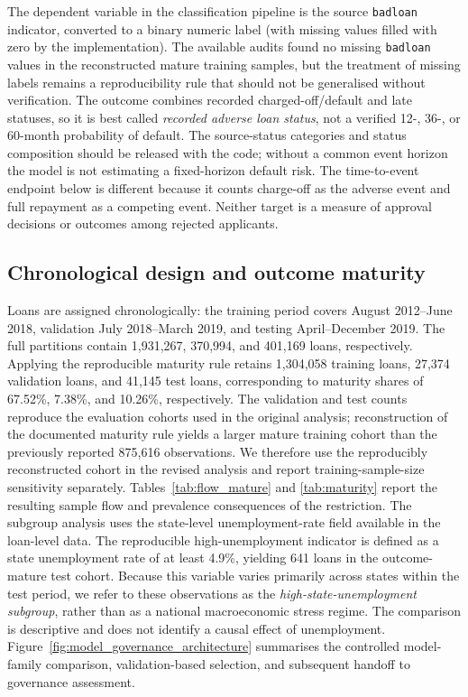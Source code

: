 \documentclass[10pt]{article}
\begin{document}
The dependent variable in the classification pipeline is the source \texttt{badloan} indicator, converted to a binary numeric label (with missing values filled with zero by the implementation). The available audits found no missing \texttt{badloan} values in the reconstructed mature training samples, but the treatment of missing labels remains a reproducibility rule that should not be generalised without verification. The outcome combines recorded charged-off/default and late statuses, so it is best called \emph{recorded adverse loan status}, not a verified 12-, 36-, or 60-month probability of default. The source-status categories and status composition should be released with the code; without a common event horizon the model is not estimating a fixed-horizon default risk. The time-to-event endpoint below is different because it counts charge-off as the adverse event and full repayment as a competing event. Neither target is a measure of approval decisions or outcomes among rejected applicants.

\subsection{Chronological design and outcome maturity}

Loans are assigned chronologically: the training period covers August 2012--June 2018, validation July 2018--March 2019, and testing April--December 2019. The full partitions contain 1,931,267, 370,994, and 401,169 loans, respectively. Applying the reproducible maturity rule retains 1,304,058 training loans, 27,374 validation loans, and 41,145 test loans, corresponding to maturity shares of 67.52\%, 7.38\%, and 10.26\%, respectively. The validation and test counts reproduce the evaluation cohorts used in the original analysis; reconstruction of the documented maturity rule yields a larger mature training cohort than the previously reported 875,616 observations. We therefore use the reproducibly reconstructed cohort in the revised analysis and report training-sample-size sensitivity separately. Tables~\ref{tab:flow_mature} and \ref{tab:maturity} report the resulting sample flow and prevalence consequences of the restriction. The subgroup analysis uses the state-level unemployment-rate field available in the loan-level data. The reproducible high-unemployment indicator is defined as a state unemployment rate of at least 4.9\%, yielding 641 loans in the outcome-mature test cohort. Because this variable varies primarily across states within the test period, we refer to these observations as the \emph{high-state-unemployment subgroup}, rather than as a national macroeconomic stress regime. The comparison is descriptive and does not identify a causal effect of unemployment. Figure~\ref{fig:model_governance_architecture} summarises the controlled model-family comparison, validation-based selection, and subsequent handoff to governance assessment.
\end{document}
